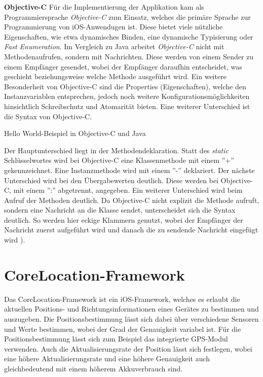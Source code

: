 \textbf{Objective-C}
Für die Implementierung der Applikation kam als Programmiersprache \emph{Objective-C} zum Einsatz, welches die primäre Sprache zur Programmierung von iOS-Anwendugen ist. 
Diese bietet viele nützliche Eigenschaften, wie etwa dynamisches Binden, eine dynamische Typisierung oder \emph{Fast Enumeration}.
Im Vergleich zu Java arbeitet \emph{Objective-C} nicht mit Methodenaufrufen, sondern mit Nachrichten. Diese werden von einem Sender zu einem Empfänger gesendet, wobei der Empfänger daraufhin entscheidet, was geschieht beziehungsweise welche Methode ausgeführt wird. Ein weitere Besonderheit von Objective-C sind die Properties (Eigenschaften), welche den Instanzvariablen entsprechen, jedoch noch weitere Konfigurationsmöglichkeiten hinsichtlich Schreibschutz und Atomarität bieten.
Eine weiterer Unterschied ist die Syntax von Objective-C.

\begin{listing}[htb!]
    \caption{Hello World-Beispiel in Objective-C und Java}
	\label{lst:helloworld_objc}
\end{listing}

Der Hauptunterschied liegt in der Methodendeklaration. Statt des \emph{static} Schlüsselwortes wird bei Objective-C eine Klassenmethode mit einem ''+'' gekennzeichnet. Eine Instanzmethode wird mit einem ''-'' deklariert. Der nächste Unterschied wird bei den Übergabewerten deutlich. Diese werden bei Objective-C, mit einem '':'' abgetrennt, angegeben.
Ein weiterer Unterschied wird beim Aufruf der Methoden deutlich. Da Objective-C nicht explizit die Methode aufruft, sondern eine Nachricht an die Klasse sendet, unterscheidet sich die Syntax deutlich. So werden hier eckige Klammern genutzt, wobei der Empfänger der Nachricht zuerst aufgeführt wird und danach die zu sendende Nachricht eingefügt wird \cite{objc}).


\section{CoreLocation-Framework}
\label{sec:technologies:corelocation}
Das CoreLocation-Framework ist ein iOS-Framework, welches es erlaubt die aktuellen Positions- und Richtungsinformationen eines Gerätes zu bestimmen und auszugeben.
Die Positionsbestimmung lässt sich dabei über verschiedene Sensoren und Werte bestimmen, wobei der Grad der Genauigkeit variabel ist.
Für die Positionsbestimmung lässt sich zum Beispiel das integrierte GPS-Modul verwenden.
Auch die Aktualisierungsrate der Position lässt sich festlegen, wobei eine höhere Aktualisierungsrate und eine höhere Genauigkeit auch gleichbedeutend mit einem höherem Akkuverbrauch sind.
	
